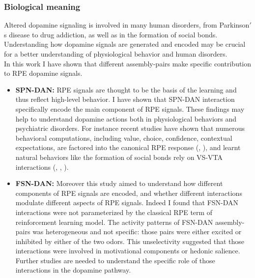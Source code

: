 \subsubsection{Biological meaning}
Altered dopamine signaling is involved in many human disorders, from Parkinson$'$s disease to drug addiction, as well as in the formation of social bonds. Understanding how dopamine signals are generated and encoded may be crucial for a better understanding of physiological behavior and human disorders.\\In this work I have shown that different assembly-pairs make specific contribution to RPE dopamine signals.
\begin{itemize}
    \item \textbf{SPN-DAN:} RPE signals are thought to be the basis of the learning and thus reflect high-level behavior. I have shown that SPN-DAN interaction specifically encode the main component of RPE signals. These findings may help to understand dopamine actions both in physiological behaviors and psychiatric disorders. For instance recent studies have shown that numerous behavioral computations, including value, choice, confidence, contextual expectations, are factored into the canonical RPE response (\cite{Gadagkar}, \cite{Stauffer}), and learnt natural behaviors like the formation of social bonds rely on VS-VTA interactions (\cite{Nestler}, \cite{Ungless2004}, \cite{Walum}). 
    \item \textbf{FSN-DAN:} Moreover this study aimed to understand how different components of RPE signals are encoded, and whether different interactions modulate different aspects of RPE signals. Indeed I found that FSN-DAN interactions were not parameterized by the classical RPE term of reinforcement learning model. The activity patterns of FSN-DAN assembly-pairs was heterogeneous and not specific: those pairs were either excited or inhibited by either of the two odors. This unselectivity suggested that those interactions were involved in motivational components or hedonic salience. Further studies are needed to understand the specific role of those interactions in the dopamine pathway.
\end{itemize}
  